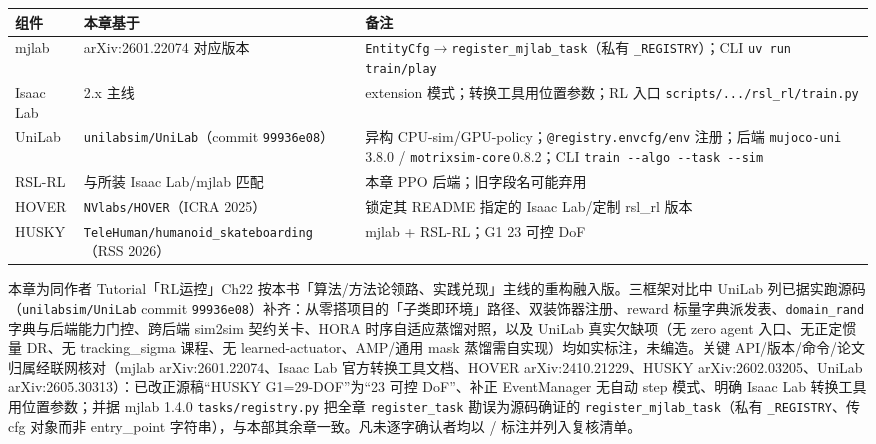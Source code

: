 \begin{center}
\small
\begin{tabular}{@{}lll@{}}
\toprule
组件 & 本章基于 & 备注 \\
\midrule
mjlab & arXiv:2601.22074 对应版本 & \verb|EntityCfg|$\to$\verb|register_mjlab_task|（私有 \verb|_REGISTRY|）；CLI \verb|uv run train/play| \\
Isaac Lab & 2.x 主线 & extension 模式；转换工具用位置参数；RL 入口 \verb|scripts/.../rsl_rl/train.py| \\
UniLab & \texttt{unilabsim/UniLab}（commit \texttt{99936e08}） & 异构 CPU-sim/GPU-policy；\verb|@registry.envcfg/env| 注册；后端 \verb|mujoco-uni|\,3.8.0 / \verb|motrixsim-core|\,0.8.2；CLI \verb|train --algo --task --sim| \\
RSL-RL & 与所装 Isaac Lab/mjlab 匹配 & 本章 PPO 后端；旧字段名可能弃用 \\
HOVER & \texttt{NVlabs/HOVER}（ICRA 2025） & 锁定其 README 指定的 Isaac Lab/定制 rsl\_rl 版本 \\
HUSKY & \texttt{TeleHuman/humanoid\_skateboarding}（RSS 2026） & mjlab + RSL-RL；G1 23 可控 DoF \\
\bottomrule
\end{tabular}
\end{center}


\begin{finenote}
本章为同作者 Tutorial「RL运控」Ch22 按本书「算法/方法论领路、实践兑现」主线的重构融入版。三框架对比中 UniLab 列已据实跑源码（\texttt{unilabsim/UniLab} commit \texttt{99936e08}）补齐：从零搭项目的「子类即环境」路径、双装饰器注册、reward 标量字典派发表、\texttt{domain\_rand} 字典与后端能力门控、跨后端 sim2sim 契约关卡、HORA 时序自适应蒸馏对照，以及 UniLab 真实欠缺项（无 zero agent 入口、无正定惯量 DR、无 tracking\_sigma 课程、无 learned-actuator、AMP/通用 mask 蒸馏需自实现）均如实标注，未编造。关键 API/版本/命令/论文归属经联网核对（mjlab arXiv:2601.22074、Isaac Lab 官方转换工具文档、HOVER arXiv:2410.21229、HUSKY arXiv:2602.03205、UniLab arXiv:2605.30313）：已改正源稿“HUSKY G1=29-DOF”为“23 可控 DoF”、补正 EventManager 无自动 step 模式、明确 Isaac Lab 转换工具用位置参数；并据 mjlab 1.4.0 \texttt{tasks/registry.py} 把全章 \texttt{register\_task} 勘误为源码确证的 \texttt{register\_mjlab\_task}（私有 \texttt{\_REGISTRY}、传 cfg 对象而非 entry\_point 字符串），与本部其余章一致。凡未逐字确认者均以 \rebuilt{} /  标注并列入复核清单。
\end{finenote}
